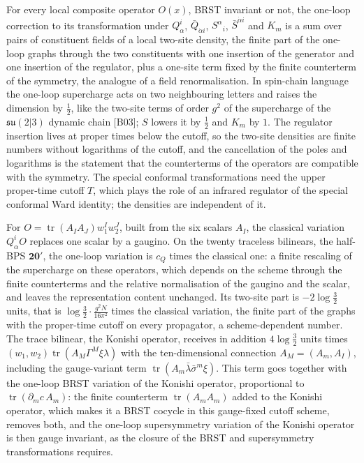 \begin{remark}
For every local composite operator $O(x)$, BRST invariant or not, the one-loop correction to its transformation under $Q^i_\alpha$, $\bar Q_{\dot\alpha i}$, $S^\alpha{}_i$, $\bar S^{\dot\alpha i}$ and $K_m$ is a sum over pairs of constituent fields of a local two-site density, the finite part of the one-loop graphs through the two constituents with one insertion of the generator and one insertion of the regulator, plus a one-site term fixed by the finite counterterm of the symmetry, the analogue of a field renormalisation. In spin-chain language the one-loop supercharge acts on two neighbouring letters and raises the dimension by $\tfrac12$, like the two-site terms of order $g^2$ of the supercharge of the $\mathfrak{su}(2|3)$ dynamic chain [B03]; $S$ lowers it by $\tfrac12$ and $K_m$ by $1$. The regulator insertion lives at proper times below the cutoff, so the two-site densities are finite numbers without logarithms of the cutoff, and the cancellation of the poles and logarithms is the statement that the counterterms of the operators are compatible with the symmetry. The special conformal transformations need the upper proper-time cutoff $T$, which plays the role of an infrared regulator of the special conformal Ward identity; the densities are independent of it.
\end{remark}

\begin{remark}
For $O=\operatorname{tr}(A_IA_J)w_1^Iw_2^J$, built from the six scalars $A_I$, the classical variation $Q^i_\alpha O$ replaces one scalar by a gaugino. On the twenty traceless bilinears, the half-BPS $\mathbf{20'}$, the one-loop variation is $c_Q$ times the classical one: a finite rescaling of the supercharge on these operators, which depends on the scheme through the finite counterterms and the relative normalisation of the gaugino and the scalar, and leaves the representation content unchanged. Its two-site part is $-2\log\tfrac32$ units, that is $\log\tfrac32\cdot\frac{g^2N}{16\pi^2}$ times the classical variation, the finite part of the graphs with the proper-time cutoff on every propagator, a scheme-dependent number. The trace bilinear, the Konishi operator, receives in addition $4\log\tfrac32$ units times $(w_1,w_2)\operatorname{tr}(A_M\Gamma^M\xi\lambda)$ with the ten-dimensional connection $A_M=(A_m,A_I)$, including the gauge-variant term $\operatorname{tr}(A_m\bar\lambda\bar\sigma^m\xi)$. This term goes together with the one-loop BRST variation of the Konishi operator, proportional to $\operatorname{tr}(\partial_mc\,A_m)$: the finite counterterm $\operatorname{tr}(A_mA_m)$ added to the Konishi operator, which makes it a BRST cocycle in this gauge-fixed cutoff scheme, removes both, and the one-loop supersymmetry variation of the Konishi operator is then gauge invariant, as the closure of the BRST and supersymmetry transformations requires.
\end{remark}

